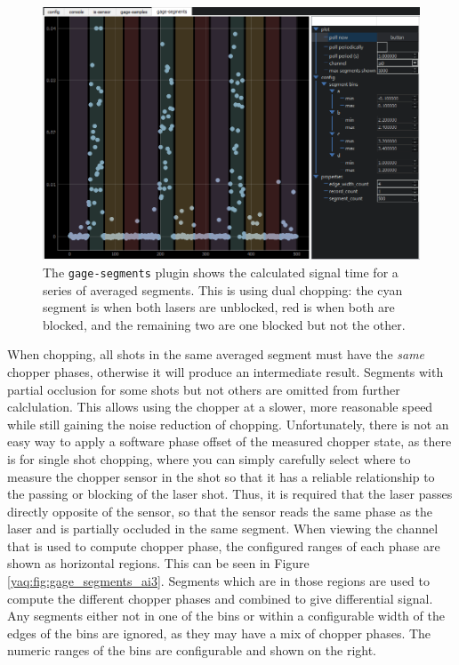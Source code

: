 \begin{landscape}
\begin{figure}
\includegraphics[width=8in]{"yaq/images/gage_segments_ai0"}
\caption[\yaqcqtpy{} Gage DAQ Plugin (segments)]{
	The \texttt{gage-segments} plugin shows the calculated signal time for a series of averaged segments.
	This is using dual chopping: the cyan segment is when both lasers are unblocked, red is when both are blocked, and the remaining two are one blocked but not the other.
}
\label{yaq:fig:gage_segments_ai0}
\end{figure}
\end{landscape}

When chopping, all shots in the same averaged segment must have the \textit{same} chopper phases, otherwise it will produce an intermediate result.
Segments with partial occlusion for some shots but not others are omitted from further calclulation.
This allows using the chopper at a slower, more reasonable speed while still gaining the noise reduction of chopping.
Unfortunately, there is not an easy way to apply a software phase offset of the measured chopper state, as there is for single shot chopping, where you can simply carefully select where to measure the chopper sensor in the shot so that it has a reliable relationship to the passing or blocking of the laser shot.
Thus, it is required that the laser passes directly opposite of the sensor, so that the sensor reads the same phase as the laser and is partially occluded in the same segment.
When viewing the channel that is used to compute chopper phase, the configured ranges of each phase are shown as horizontal regions.
This can be seen in Figure \ref{yaq:fig:gage_segments_ai3}.
Segments which are in those regions are used to compute the different chopper phases and combined to give differential signal.
Any segments either not in one of the bins or within a configurable width of the edges of the bins are ignored, as they may have a mix of chopper phases.
The numeric ranges of the bins are configurable and shown on the right.

